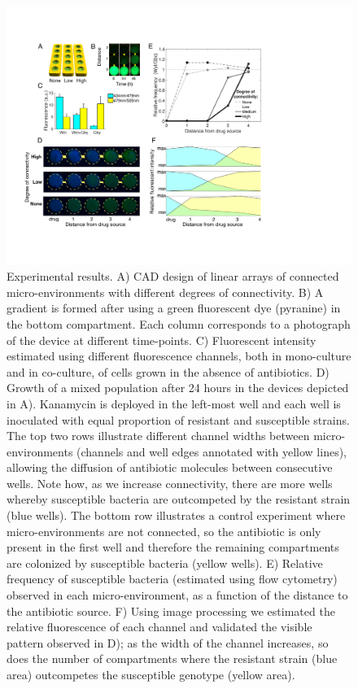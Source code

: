 \documentclass[fleqn,12pt]{wlscirep}
\begin{document}
\begin{figure}[ht!]
\centering
\includegraphics[width=.9\linewidth]{figures/Figure4.pdf}
\caption{\footnotesize Experimental results. A) CAD design of linear arrays of connected micro-environments with different degrees of connectivity. B) A gradient is formed after using a green fluorescent dye (pyranine) in the bottom compartment. Each column corresponds to a photograph of the device at different time-points.  C) Fluorescent intensity estimated using different fluorescence channels, both in mono-culture and in co-culture, of cells grown in the absence of antibiotics.  D) Growth of a mixed population after 24 hours in the devices depicted in A). Kanamycin is deployed in the left-most well and each well is inoculated with equal proportion of resistant and susceptible strains. The top two rows illustrate different channel widths between micro-environments (channels and well edges annotated with yellow lines), allowing the diffusion of antibiotic molecules between consecutive wells. Note how, as we increase connectivity, there are more wells whereby susceptible bacteria are outcompeted by the resistant strain (blue wells). The bottom row illustrates a control experiment where micro-environments are not connected, so the antibiotic is only present in the first well and therefore the remaining compartments are colonized by susceptible bacteria (yellow wells).   E) Relative frequency of susceptible bacteria (estimated using flow cytometry) observed in each micro-environment, as a function of the distance to the antibiotic source. F) Using image processing we estimated the relative fluorescence of each channel and validated the visible pattern observed in D); as the width of the channel increases, so does the number of compartments where the resistant strain (blue area) outcompetes the susceptible genotype (yellow area). }
\label{fig:figure4}
\end{figure}
\end{document}
